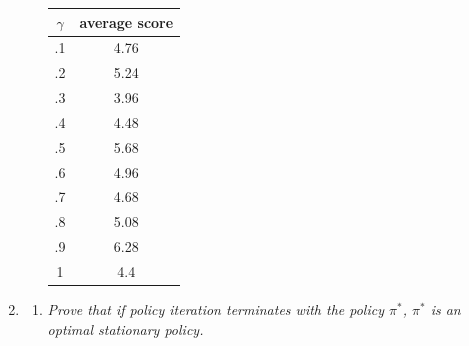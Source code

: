 \documentclass{article}
\begin{document}
\begin{enumerate}
\begin{enumerate}
    \begin{center}
      \begin{tabular}{|c|c|}\hline
        $\gamma$ & average score \\\hline
        .1 & 4.76 \\
        .2 & 5.24 \\
        .3 & 3.96 \\
        .4 & 4.48 \\
        .5 & 5.68 \\
        .6 & 4.96 \\
        .7 & 4.68 \\
        .8 & 5.08 \\
        .9 & 6.28 \\
        1 & 4.4 \\\hline
      \end{tabular}
    \end{center}





  \end{enumerate}

\item 
  \begin{enumerate}
  \item \emph{Prove that if policy iteration terminates with the
    policy $\pi^*$, $\pi^*$ is an optimal stationary policy.}


\end{enumerate}
\end{enumerate}
\end{document}
